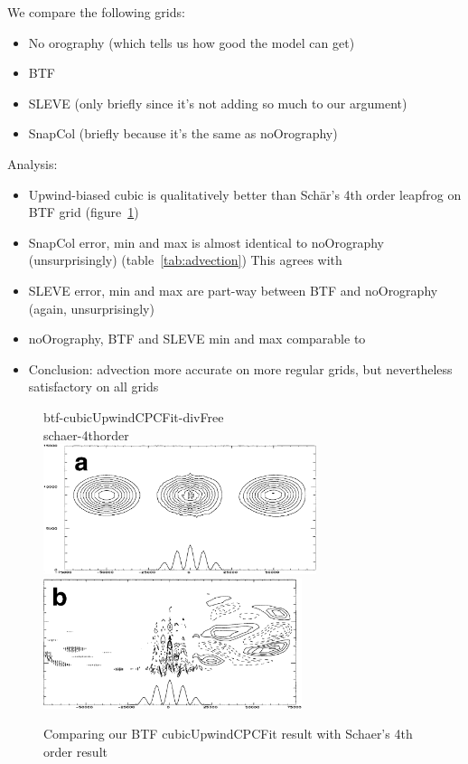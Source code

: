 \documentclass{ametsoc}
\begin{document}
We compare the following grids:
\begin{itemize}
	\item No orography (which tells us how good the model can get)
	\item BTF
	\item SLEVE (only briefly since it's not adding so much to our argument)
	\item SnapCol (briefly because it's the same as noOrography)
\end{itemize}

Analysis:
\begin{itemize}
	\item Upwind-biased cubic is qualitatively better than Sch\"ar's 4th order leapfrog on BTF grid (figure~\ref{fig:advection})
	\item SnapCol error, min and max is almost identical to noOrography (unsurprisingly) (table~\ref{tab:advection})  This agrees with \textcite{good2014}
	\item SLEVE error, min and max are part-way between BTF and noOrography (again, unsurprisingly)
	\item noOrography, BTF and SLEVE min and max comparable to \textcite{schaer2002}
	\item Conclusion: advection more accurate on more regular grids, but nevertheless satisfactory on all grids
\end{itemize}

\begin{figure}
	btf-cubicUpwindCPCFit-divFree \\
	
	

	schaer-4thorder \\
	\includegraphics[height=1.5in]{schaer-btf-4thorder.png}
	\includegraphics[height=1.5in]{schaer-btf-4thorder-error.png}
%
	\caption{Comparing our BTF cubicUpwindCPCFit result with Schaer's 4th order result}
	\label{fig:advection}
\end{figure}
\end{document}
